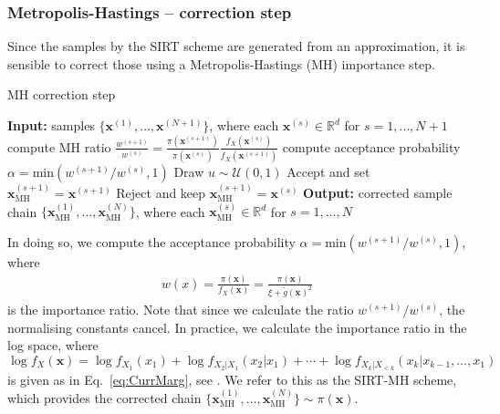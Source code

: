 \subsubsection{Metropolis-Hastings -- correction step}
Since the samples by the SIRT scheme are generated from an approximation, it is sensible to correct those using a Metropolis-Hastings (MH) importance step.
\begin{algorithm}[!ht]
	\caption{MH correction step}
	\begin{algorithmic}[1]
		\STATE \textbf{Input:} samples $\{ \bm{x}^{(1)},\dots, \bm{x}^{(N+1)} \} $, where each $\bm{x}^{(s)} \in \mathbb{R}^d$ for $s = 1, \dots, N+1$
		\STATE compute MH ratio $\frac{w^{(s+1)}}{w^{(s)} } =\frac{\pi(\bm{x}^{(s+1)})}{\pi(\bm{x}^{(s)})} \frac{f_X(\bm{x}^{(s)})}{f_X(\bm{x}^{(s+1)})}$ 
		\STATE compute acceptance probability $\alpha = \text{min}(w^{(s+1)}/w^{(s)}, 1)$ 
		\STATE Draw $u \sim \mathcal{U}(0,1)$
		\STATE Accept and set $\bm{x}_{\text{MH}}^{(s+1)} = \bm{x}^{(s+1)}$
		\ELSE  
		\STATE Reject and keep $\bm{x}_{\text{MH}}^{(s+1)} = \bm{x}^{(s)}$
		\ENDIF
		\ENDFOR
		\STATE \textbf{Output:} corrected sample chain $\{ \bm{x}_{\text{MH}}^{(1)},\dots, \bm{x}_{\text{MH}}^{(N)} \} $, where each $\bm{x}_{\text{MH}}^{(s)} \in \mathbb{R}^d$ for $s = 1, \dots, N$
	\end{algorithmic}
	\label{alg:MHCorr}
\end{algorithm}
In doing so, we compute the acceptance probability $  \alpha = \text{min}(w^{(s+1)}/w^{(s)}, 1)$, where 
\begin{align}
	w(x) = \frac{\pi(\bm{x})}{f_X(\bm{x})} = \frac{\pi(\bm{x})}{\xi + \tilde{g}(\bm{x})^2} 
\end{align}
is the importance ratio.
Note that since we calculate the ratio $w^{(s+1)}/w^{(s)}$, the normalising constants cancel.
In practice, we calculate the importance ratio in the log space, where $\log f_X(\bm{x})  =  \log f_{X_1}(x_1) + \log f_{X_2|X_1}(x_2|x_1) + \cdots + \log f_{X_k|X_{<k}}(x_k|x_{k-1},\dots,x_1)$ is given as in Eq.~\ref{eq:CurrMarg}, see \cite{dolgov2020approximation}.
We refer to this as the SIRT-MH scheme, which provides the corrected chain $ \{ \bm{x}_{\text{MH}}^{(1)},\dots, \bm{x}_{\text{MH}}^{(N)}  \} \sim \pi(\bm{x}) $.


